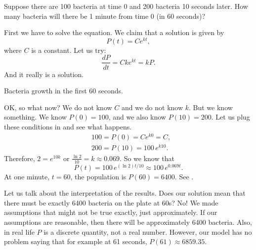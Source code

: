 \begin{example}
Suppose there are 100 bacteria at time 0 and 200 bacteria 10 seconds later.
How many bacteria will there be 1 minute from time 0 (in 60 seconds)?

First we have to solve the equation.  We claim that a solution is given by
\begin{equation*}
P(t) = C e^{kt} ,
\end{equation*}
where $C$ is a constant.  Let us try:
\begin{equation*}
\frac{dP}{dt} = C k e^{kt} = k P .
\end{equation*}
And it really is a solution.

\begin{mywrapfig}{3.25in}
\capstart
{}
\caption{Bacteria growth in the first 60 seconds.\label{intro:plotbactfig}}
\end{mywrapfig}
%
%
OK\@, so what now?  We do not know $C$ and we do not know $k$.  But we know
something.  We know $P(0) = 100$, and we also know 
$P(10) = 200$.  Let us plug these conditions in and see what happens.
\begin{align*}
& 100 = P(0) = C e^{k0} = C ,\\
& 200 = P(10) = 100 \, e^{k10} .
\end{align*}
Therefore, $2 = e^{10k}$ or $\frac{\ln 2}{10} = k \approx 0.069$.
So we know that
\begin{equation*}
P(t) = 100 \, e^{(\ln 2) t / 10} \approx 100 \, e^{0.069 t} .
\end{equation*}
At one minute, $t=60$, the population is $P(60) = 6400$.  See
.




Let us talk about the interpretation of the results.  Does our solution
mean that
there must be exactly 6400 bacteria on the plate at 60s?  No!  We made
assumptions that might not be true exactly, just approximately.
If our assumptions are reasonable,
then there will be approximately 6400 bacteria.
Also, in real life $P$ is a
discrete quantity, not a real number.  However, our model has no problem saying
that for example at 61 seconds, $P(61) \approx 6859.35$.
\end{example}

